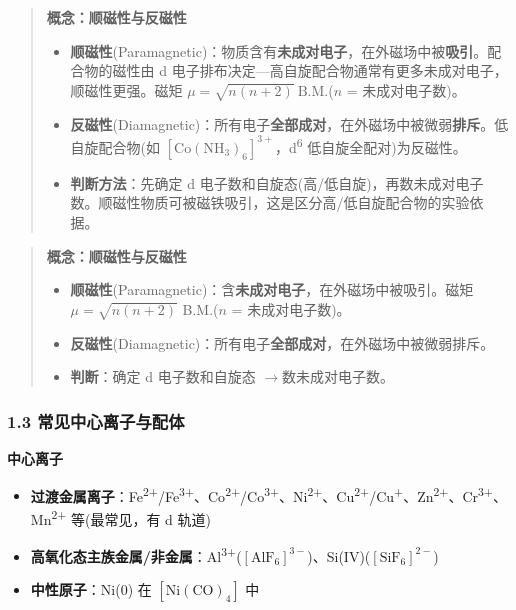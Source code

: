 \documentclass[a4paper,11pt]{ctexart}
\providecommand{\tightlist}{\setlength{\itemsep}{0pt}\setlength{\parskip}{0pt}}
\newcommand{\箭}{\ensuremath{\rightarrow}}
\newcommand{\左箭}{\ensuremath{\leftarrow}}
\newcommand{\上箭}{\ensuremath{\uparrow}}
\newcommand{\下箭}{\ensuremath{\downarrow}}
\newcommand{\衡}{\ensuremath{\rightleftharpoons}}
\newcommand{\双箭}{\ensuremath{\leftrightarrow}}
\newcommand{\约等于}{\ensuremath{\approx}}
\newcommand{\小于等于}{\ensuremath{\leq}}
\newcommand{\大于等于}{\ensuremath{\geq}}
\newcommand{\不等于}{\ensuremath{\neq}}
\newcommand{\西格马}{\ensuremath{\sigma}}
\newcommand{\派}{\ensuremath{\pi}}
\begin{document}
\begin{quote}
\textbf{概念：顺磁性与反磁性}

\begin{itemize}
\tightlist
\item
  \textbf{顺磁性}(Paramagnetic)：物质含有\textbf{未成对电子}，在外磁场中被\textbf{吸引}。配合物的磁性由 d 电子排布决定---高自旋配合物通常有更多未成对电子，顺磁性更强。磁矩 \(\mu = \sqrt{n(n+2)}\ \mathrm{B.M.}\)(\(n\) = 未成对电子数)。
\item
  \textbf{反磁性}(Diamagnetic)：所有电子\textbf{全部成对}，在外磁场中被微弱\textbf{排斥}。低自旋配合物(如 \([\mathrm{Co(NH_3)_6}]^{3+}\)，d\textsuperscript{6} 低自旋全配对)为反磁性。
\item
  \textbf{判断方法}：先确定 d 电子数和自旋态(高/低自旋)，再数未成对电子数。顺磁性物质可被磁铁吸引，这是区分高/低自旋配合物的实验依据。
\end{itemize}
\end{quote}

\begin{quote}
\textbf{概念：顺磁性与反磁性}

\begin{itemize}
\tightlist
\item
  \textbf{顺磁性}(Paramagnetic)：含\textbf{未成对电子}，在外磁场中被吸引。磁矩 \(\mu = \sqrt{n(n+2)}\) B.M.(\(n\) = 未成对电子数)。
\item
  \textbf{反磁性}(Diamagnetic)：所有电子\textbf{全部成对}，在外磁场中被微弱排斥。
\item
  \textbf{判断}：确定 d 电子数和自旋态 \箭 数未成对电子数。
\end{itemize}
\end{quote}

\subsubsection{1.3 常见中心离子与配体}\label{ux5e38ux89c1ux4e2dux5fc3ux79bbux5b50ux4e0eux914dux4f53}

\textbf{中心离子}

\begin{itemize}
\tightlist
\item
  \textbf{过渡金属离子}：Fe\textsuperscript{2+}/Fe\textsuperscript{3+}、Co\textsuperscript{2+}/Co\textsuperscript{3+}、Ni\textsuperscript{2+}、Cu\textsuperscript{2+}/Cu\textsuperscript{+}、Zn\textsuperscript{2+}、Cr\textsuperscript{3+}、Mn\textsuperscript{2+} 等(最常见，有 d 轨道)
\item
  \textbf{高氧化态主族金属/非金属}：Al\textsuperscript{3+}(\([\mathrm{AlF_6}]^{3-}\))、Si(IV)(\([\mathrm{SiF_6}]^{2-}\))
\item
  \textbf{中性原子}：Ni(0) 在 \([\mathrm{Ni(CO)_4}]\) 中
\end{itemize}
\end{document}
